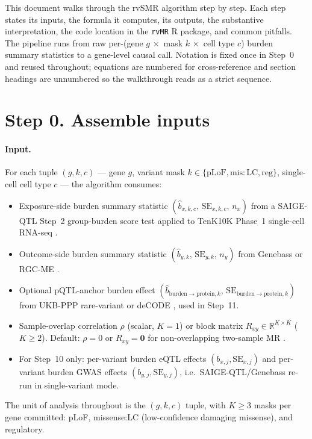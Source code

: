 \documentclass[11pt]{article}
\begin{document}
\noindent
This document walks through the rvSMR algorithm step by step. Each step states its inputs, the formula it computes, its outputs, the substantive interpretation, the code location in the \texttt{rvMR} R package, and common pitfalls. The pipeline runs from raw per-(gene $g\,\times$ mask $k\,\times$ cell type $c$) burden summary statistics to a gene-level causal call. Notation is fixed once in Step~0 and reused throughout; equations are numbered for cross-reference and section headings are unnumbered so the walkthrough reads as a strict sequence.

\section*{Step 0. Assemble inputs}

\paragraph{Input.} For each tuple $(g,k,c)$ --- gene $g$, variant mask $k\in\{\mathrm{pLoF},\mathrm{mis{:}LC},\mathrm{reg}\}$, single-cell cell type $c$ --- the algorithm consumes:
\begin{itemize}
\item Exposure-side burden summary statistic $(\hat b_{x,k,c},\,\mathrm{SE}_{x,k,c},\,n_x)$ from a SAIGE-QTL Step~2 group-burden score test \citep{ZhouCuomo2024,ZhouSAIGEgene2022} applied to TenK10K Phase~1 single-cell RNA-seq \citep{Cuomo2025}.
\item Outcome-side burden summary statistic $(\hat b_{y,k},\,\mathrm{SE}_{y,k},\,n_y)$ from Genebass \citep{Karczewski2022} or RGC-ME \citep{SunKY2024}.
\item Optional pQTL-anchor burden effect $(\hat b_{\mathrm{burden}\to\mathrm{protein},k},\,\mathrm{SE}_{\mathrm{burden}\to\mathrm{protein},k})$ from UKB-PPP rare-variant \citep{Dhindsa2023,SunUKBPPP2023} or deCODE \citep{Ferkingstad2021}, used in Step~11.
\item Sample-overlap correlation $\rho$ (scalar, $K{=}1$) or block matrix $R_{xy}\in\mathbb{R}^{K\times K}$ ($K{\ge}2$). Default: $\rho{=}0$ or $R_{xy}{=}\mathbf{0}$ for non-overlapping two-sample MR \citep{PierceBurgess2013,BurgessButterworthThompson2013,BurgessOverlap2016}.
\item For Step~10 only: per-variant burden eQTL effects $(b_{x,j},\mathrm{SE}_{x,j})$ and per-variant burden GWAS effects $(b_{y,j},\mathrm{SE}_{y,j})$, i.e.\ SAIGE-QTL/Genebass re-run in single-variant mode.
\end{itemize}
The unit of analysis throughout is the $(g,k,c)$ tuple, with $K\ge 3$ masks per gene committed: pLoF, missense:LC (low-confidence damaging missense), and regulatory.
\end{document}
